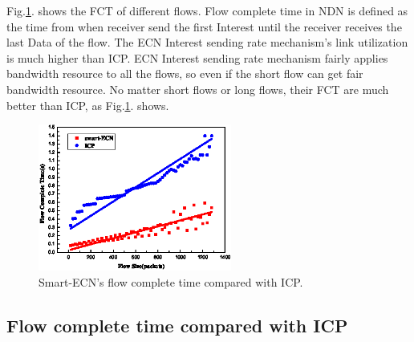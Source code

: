 Fig.\ref{fig-fct}. shows the FCT of different flows. Flow complete time in NDN is defined as the time from when receiver send the first Interest until the receiver receives the last Data of the flow. The ECN Interest sending rate mechanism's link utilization is much higher than ICP. ECN Interest sending rate mechanism fairly applies bandwidth resource to all the flows, so even if the short flow can get fair bandwidth resource. No matter short flows or long flows, their FCT are much better than ICP, as Fig.\ref{fig-fct}. shows.
\begin{figure}[t]
\centering
\includegraphics[width=2.5in]{fct-cut.eps}
\centering
\caption{ Smart-ECN's flow complete time compared with ICP.}
\label{fig-fct}
\end{figure}
\subsection{Flow complete time compared with ICP}


